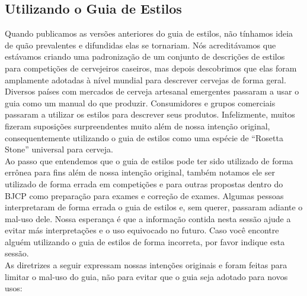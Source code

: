 \subsection*{Utilizando o Guia de Estilos}
Quando publicamos as versões anteriores do guia de estilos, não tínhamos ideia de quão prevalentes e difundidas elas se tornariam.  Nós acreditávamos que estávamos criando uma padronização de um conjunto de descrições de estilos para competições de cervejeiros caseiros, mas depois descobrimos que elas foram amplamente adotadas à nível mundial para descrever cervejas de forma geral. Diversos países com mercados de cerveja artesanal emergentes passaram a usar o guia como um manual do que produzir. Consumidores e grupos comerciais passaram a utilizar os estilos para descrever seus produtos. Infelizmente, muitos fizeram suposições surpreendentes muito além de nossa intenção original, consequentemente utilizando o guia de estilos como uma espécie de “Rosetta Stone” universal para cerveja.\\
Ao passo que entendemos que o guia de estilos pode ter sido utilizado de forma errônea para fins além de nossa intenção original, também notamos ele ser utilizado de forma errada em competições e para outras propostas dentro do BJCP como preparação para exames e correção de exames. Algumas pessoas interpretaram de forma errada o guia de estilos e, sem querer, passaram adiante o mal-uso dele. Nossa esperança é que a informação contida nesta sessão ajude a evitar más interpretações e o uso equivocado no futuro. Caso você encontre alguém utilizando o guia de estilos de forma incorreta, por favor indique esta sessão.\\
As diretrizes a seguir expressam nossas intenções originais e foram feitas para limitar o mal-uso do guia, não para evitar que o guia seja adotado para novos usos:
